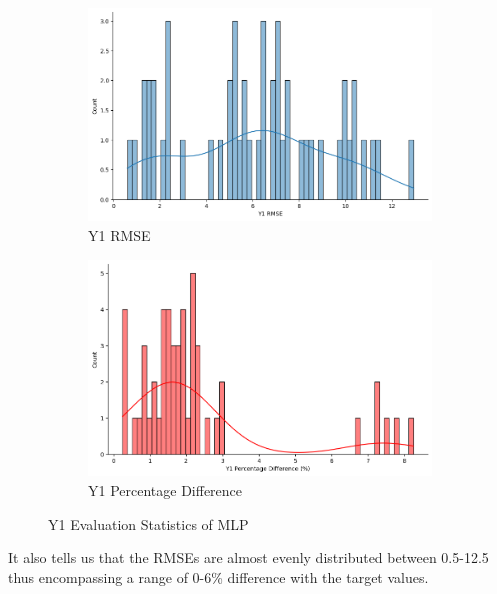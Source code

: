 \documentclass{report} %
\begin{document}
\begin{figure}[H]
    \centering
    \begin{subfigure}{0.5\textwidth}
        \centering
        \includegraphics[width=\textwidth]{./ReportImages/score_MLP_y1.png}
        \caption{Y1 \ac{RMSE}}
        \label{fig:Y1 RMSE}
    \end{subfigure}\hfill
    \begin{subfigure}{0.5\textwidth}
        \centering
        \includegraphics[width=\textwidth]{./ReportImages/percentage_diff_MLP_y1.png}
        \caption{Y1 Percentage Difference}
        \label{fig:Y1 Percentage Difference}
    \end{subfigure}
    \caption{Y1 Evaluation Statistics of \ac{MLP}}
    \label{fig:Y1 Evaluation Statistics MLP}
\end{figure}

It also tells us that the \ac{RMSE}s are almost evenly distributed between 0.5-12.5 thus encompassing a range of 0-6\% difference with the target values.\\
\end{document}
